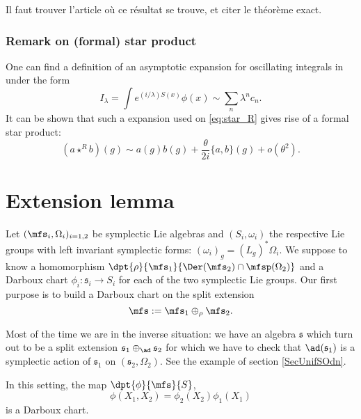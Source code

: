 \begin{probleme}
Il faut trouver l'article où ce résultat se trouve, et citer le théorème exact.
\label{ProbEnonSLdef}
\end{probleme}

\subsubsection{Remark on (formal) star product}\label{subsec:rem_on_sp}

One can  find a definition of an asymptotic expansion for oscillating integrals in \cite{Dieu7} under the form
\[
   I_{\lambda}=\int e^{(i/\lambda)S(x)}\phi(x)\sim\sum_n\lambda^nc_n.
\]
It can be shown that such a  expansion used on \eqref{eq:star_R} gives rise of a formal star product:
\begin{equation}	\label{EqDevFedFor}
(a\star^{R} b)(g)\sim a(g)b(g)+\frac{\theta}{2i}\{a,b\}(g)+o(\theta^2).
\end{equation}

\section{Extension lemma}		\label{SecExtLem}

Let $(\mfs_i,\Omega_i)_{i=1,2}$ be  symplectic Lie algebras and $(S_i,\omega_i)$ the respective Lie groups with left invariant symplectic forms: $(\omega_i)_g=(L_g)^*\Omega_i$. 
We suppose to know a homomorphism  $\dpt{\rho}{\mfs_1}{\Der(\mfs_2)\cap\mfsp(\Omega_2)}$ and a Darboux chart $\phi_i\colon \mathfrak{s}_i\to S_i$ for each of the two symplectic Lie groups. Our first purpose is to build a Darboux chart on the split extension
\[
   \mfs:=\mfs_1\oplus_{\rho}\mfs_2.
\]

\begin{remark}
Most of the time we are in the inverse situation: we have an algebra $\mathfrak{s}$ which turn out to be a split extension $\mathfrak{s}_{1}\oplus_{\ad}\mathfrak{s}_{2}$ for which we have to check that $\ad(\mathfrak{s}_{1})$ is a symplectic action of $\mathfrak{s}_{1}$ on $(\mathfrak{s}_{2},\Omega_{2})$. See the example of section \ref{SecUnifSOdn}.
\end{remark}
 
\begin{proposition}
In this setting, the map $\dpt{\phi}{\mfs}{S}$,
\begin{equation}
  \phi(X_1,X_2)=\phi_2(X_2)\phi_1(X_1)
\end{equation}
is a Darboux chart.
\label{prop:Darboux}
\end{proposition}

